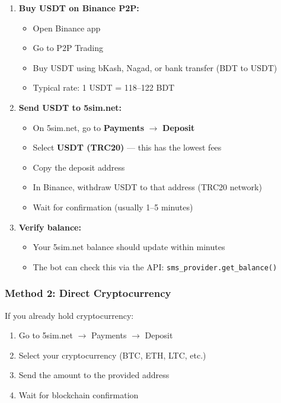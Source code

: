 \begin{enumerate}
    \item \textbf{Buy USDT on Binance P2P:}
    \begin{itemize}
        \item Open Binance app
        \item Go to P2P Trading
        \item Buy USDT using bKash, Nagad, or bank transfer (BDT to USDT)
        \item Typical rate: 1 USDT = 118--122 BDT
    \end{itemize}
    
    \item \textbf{Send USDT to 5sim.net:}
    \begin{itemize}
        \item On 5sim.net, go to \textbf{Payments} $\rightarrow$ \textbf{Deposit}
        \item Select \textbf{USDT (TRC20)} --- this has the lowest fees
        \item Copy the deposit address
        \item In Binance, withdraw USDT to that address (TRC20 network)
        \item Wait for confirmation (usually 1--5 minutes)
    \end{itemize}
    
    \item \textbf{Verify balance:}
    \begin{itemize}
        \item Your 5sim.net balance should update within minutes
        \item The bot can check this via the API: \texttt{sms\_provider.get\_balance()}
    \end{itemize}
\end{enumerate}

\subsubsection{Method 2: Direct Cryptocurrency}

If you already hold cryptocurrency:
\begin{enumerate}
    \item Go to 5sim.net $\rightarrow$ Payments $\rightarrow$ Deposit
    \item Select your cryptocurrency (BTC, ETH, LTC, etc.)
    \item Send the amount to the provided address
    \item Wait for blockchain confirmation
\end{enumerate}

